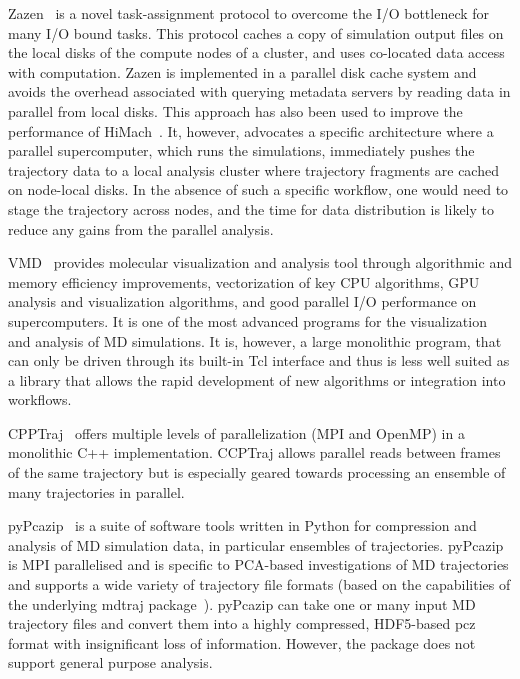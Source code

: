 Zazen~\cite{Zazen} is a novel task-assignment protocol to overcome the I/O bottleneck for many I/O bound tasks. This protocol caches a copy of simulation output files on the local disks of the compute nodes of a cluster, and uses co-located data access with computation. 
Zazen is implemented in a parallel disk cache system and avoids the overhead associated with querying metadata servers by reading data in parallel from local disks.
This approach has also been used to improve the performance of HiMach~\cite{himach-2008}.
It, however, advocates a specific architecture where a parallel supercomputer, which runs the simulations, immediately pushes the trajectory data to a local analysis cluster where trajectory fragments are cached on node-local disks.
In the absence of such a specific  workflow, one would need to stage the trajectory across nodes, and the time for data distribution is likely to reduce any gains from the parallel analysis.

VMD~\cite{Hum96, VMD2013} provides molecular visualization and analysis tool through algorithmic and memory efficiency improvements, vectorization of key CPU algorithms, GPU analysis and visualization algorithms, and good parallel I/O performance on supercomputers. It is one of the most advanced programs for the visualization and analysis of MD simulations. It is, however, a large monolithic program, that can only be driven through its built-in Tcl interface and thus is less well suited as a library that allows the rapid development of new algorithms or integration into workflows.

CPPTraj~\cite{cpptraj-2013} offers multiple levels of parallelization (MPI and OpenMP) in a monolithic C++ implementation.
CCPTraj allows parallel reads between frames of the same trajectory but is especially geared towards processing an ensemble of many trajectories in parallel.

pyPcazip~\cite{pyPcazip} is a suite of software tools written in Python for compression and analysis of MD simulation data, in particular ensembles of trajectories. 
pyPcazip is MPI parallelised and is specific to PCA-based investigations of MD trajectories and supports a wide variety of trajectory file formats (based on the capabilities of the underlying mdtraj package~\cite{McGibbon:2015aa}).
pyPcazip can take one or many input MD trajectory files and convert them into a highly compressed, HDF5-based pcz format with insignificant loss of information.
However, the package does not support general purpose analysis.

